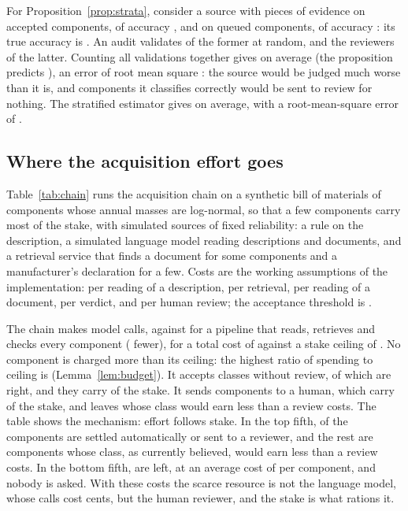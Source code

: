 For Proposition~\ref{prop:strata}, consider a source with \SynStrateNacc{} pieces of evidence on accepted
components, of accuracy \SynStrateRacc, and \SynStrateNfile{} on queued components, of accuracy \SynStrateRfile:
its true accuracy is \SynStrateVraie. An audit validates \SynStrateKacc{} of the former at random, and the
reviewers \SynStrateKfile{} of the latter. Counting all validations together gives \SynStrateEnsemble{} on average
(the proposition predicts \SynStrateAttendu), an error of root mean square \SynStrateEqmEnsemble: the source would
be judged much worse than it is, and components it classifies correctly would be sent to review for nothing. The
stratified estimator gives \SynStrateStrates{} on average, with a root-mean-square error of \SynStrateEqmStrates.

\subsection{Where the acquisition effort goes}

Table~\ref{tab:chain} runs the acquisition chain on a synthetic bill of materials of \SynChainePieces{} components
whose annual masses are log-normal, so that a few components carry most of the stake, with simulated sources of
fixed reliability: a rule on the description, a simulated language model reading descriptions and documents, and a
retrieval service that finds a document for some components and a manufacturer's declaration for a few. Costs are
the working assumptions of the implementation: \CoutDescription{} per reading of a description, \CoutCollecte{}
per retrieval, \CoutExtraction{} per reading of a document, \CoutControle{} per verdict, and \CoutRevue{} per human
review; the acceptance threshold is \SeuilAcceptation.

The chain makes \SynChaineAppels{} model calls, against \SynChaineExhaustif{} for a pipeline that reads, retrieves
and checks every component (\SynChaineEconomie{} fewer), for a total cost of \SynChaineCout{} against a stake
ceiling of \SynChaineEnjeu. No component is charged more than its ceiling: the highest ratio of
spending to ceiling is \SynChaineRatio{} (Lemma~\ref{lem:budget}). It accepts \SynChaineAcceptees{} classes without review, of which
\SynChaineJustesse{} are right, and they carry \SynChaineEnjeuAcceptees{} of the stake. It sends
\SynChaineRevue{} components to a human, which carry \SynChaineEnjeuRevue{} of the stake, and leaves
\SynChaineLaissees{} whose class would earn less than a review costs. The table shows the mechanism: effort follows stake. In the top fifth, \SynChaineHautTraites{} of the
components are settled automatically or sent to a reviewer, and the rest are components whose class, as currently
believed, would earn less than a review costs. In the bottom fifth, \SynChaineBasLaissees{} are left, at an average
cost of \SynChaineBasCout{} per component, and nobody is asked. With these costs the scarce resource is not the
language model, whose calls cost cents, but the human reviewer, and the stake is what rations it.

